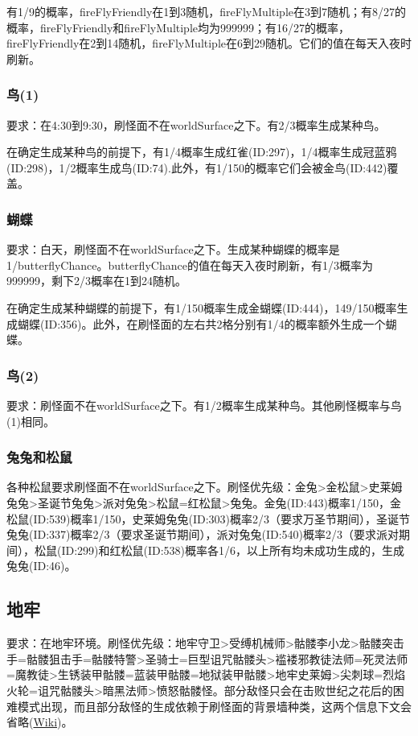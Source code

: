 有1/9的概率，fireFlyFriendly在1到3随机，fireFlyMultiple在3到7随机；有8/27的概率，fireFlyFriendly和fireFlyMultiple均为999999；有16/27的概率，fireFlyFriendly在2到14随机，fireFlyMultiple在6到29随机。它们的值在每天入夜时刷新。

\subsubsection{鸟(1)}
要求：在4:30到9:30，刷怪面不在worldSurface之下。有2/3概率生成某种鸟。

在确定生成某种鸟的前提下，有1/4概率生成红雀(ID:297)，1/4概率生成冠蓝鸦(ID:298)，1/2概率生成鸟(ID:74).此外，有1/150的概率它们会被金鸟(ID:442)覆盖。

\subsubsection{蝴蝶}\label{app11}
要求：白天，刷怪面不在worldSurface之下。生成某种蝴蝶的概率是1/butterflyChance。butterflyChance的值在每天入夜时刷新，有1/3概率为999999，剩下2/3概率在1到24随机。

在确定生成某种蝴蝶的前提下，有1/150概率生成金蝴蝶(ID:444)，149/150概率生成蝴蝶(ID:356)。此外，在刷怪面的左右共2格分别有1/4的概率额外生成一个蝴蝶。

\subsubsection{鸟(2)}
要求：刷怪面不在worldSurface之下。有1/2概率生成某种鸟。其他刷怪概率与鸟(1)相同。

\subsubsection{兔兔和松鼠}\label{app12}
各种松鼠要求刷怪面不在worldSurface之下。刷怪优先级：金兔>金松鼠>史莱姆兔兔>圣诞节兔兔>派对兔兔>松鼠=红松鼠>兔兔。金兔(ID:443)概率1/150，金松鼠(ID:539)概率1/150，史莱姆兔兔(ID:303)概率2/3（要求万圣节期间），圣诞节兔兔(ID:337)概率2/3（要求圣诞节期间），派对兔兔(ID:540)概率2/3（要求派对期间），松鼠(ID:299)和红松鼠(ID:538)概率各1/6，以上所有均未成功生成的，生成兔兔(ID:46)。

\subsection{地牢}
要求：在地牢环境。刷怪优先级：地牢守卫>受缚机械师>骷髅李小龙>骷髅突击手=骷髅狙击手=骷髅特警>圣骑士=巨型诅咒骷髅头>褴褛邪教徒法师=死灵法师=魔教徒>生锈装甲骷髅=蓝装甲骷髅=地狱装甲骷髅>地牢史莱姆>尖刺球=烈焰火轮=诅咒骷髅头>暗黑法师>愤怒骷髅怪。部分敌怪只会在击败世纪之花后的困难模式出现，而且部分敌怪的生成依赖于刷怪面的背景墙种类，这两个信息下文会省略(\href{https://terraria-zh.gamepedia.com/地牢\#.E5.9B.B0.E9.9A.BE.E6.A8.A1.E5.BC.8F.E4.B8.96.E7.BA.AA.E4.B9.8B.E8.8A.B1.E5.90.8E.E7.9A.84.E5.9C.B0.E7.89.A2}{Wiki})。

